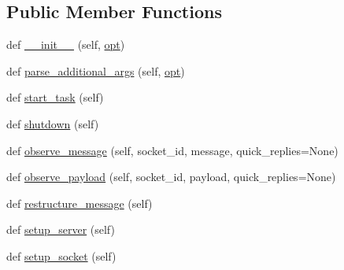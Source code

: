 \subsection*{Public Member Functions}
\begin{DoxyCompactItemize}
\item 
def \hyperlink{classparlai_1_1chat__service_1_1services_1_1websocket_1_1websocket__manager_1_1WebsocketManager_ae44392cd364b3041420877e4f281261e}{\+\_\+\+\_\+init\+\_\+\+\_\+} (self, \hyperlink{classparlai_1_1chat__service_1_1services_1_1websocket_1_1websocket__manager_1_1WebsocketManager_a48a72c535cb36615ba3f698446ab4aef}{opt})
\item 
def \hyperlink{classparlai_1_1chat__service_1_1services_1_1websocket_1_1websocket__manager_1_1WebsocketManager_ab5ae0fc35ee7b4c2015954814b8b60de}{parse\+\_\+additional\+\_\+args} (self, \hyperlink{classparlai_1_1chat__service_1_1services_1_1websocket_1_1websocket__manager_1_1WebsocketManager_a48a72c535cb36615ba3f698446ab4aef}{opt})
\item 
def \hyperlink{classparlai_1_1chat__service_1_1services_1_1websocket_1_1websocket__manager_1_1WebsocketManager_a79bfe4b1d87644284affbe3963c8decd}{start\+\_\+task} (self)
\item 
def \hyperlink{classparlai_1_1chat__service_1_1services_1_1websocket_1_1websocket__manager_1_1WebsocketManager_a50a3ee9e3306b49c38eb1c480aa03734}{shutdown} (self)
\item 
def \hyperlink{classparlai_1_1chat__service_1_1services_1_1websocket_1_1websocket__manager_1_1WebsocketManager_ab4710951b0d3ac7e00836c15760edf4a}{observe\+\_\+message} (self, socket\+\_\+id, message, quick\+\_\+replies=None)
\item 
def \hyperlink{classparlai_1_1chat__service_1_1services_1_1websocket_1_1websocket__manager_1_1WebsocketManager_a71ce917832632d10f3aafd6e8644d3f5}{observe\+\_\+payload} (self, socket\+\_\+id, payload, quick\+\_\+replies=None)
\item 
def \hyperlink{classparlai_1_1chat__service_1_1services_1_1websocket_1_1websocket__manager_1_1WebsocketManager_ab50f384331aea23175f690642717958a}{restructure\+\_\+message} (self)
\item 
def \hyperlink{classparlai_1_1chat__service_1_1services_1_1websocket_1_1websocket__manager_1_1WebsocketManager_abd3815e2b102c46a68be1f907749cd05}{setup\+\_\+server} (self)
\item 
def \hyperlink{classparlai_1_1chat__service_1_1services_1_1websocket_1_1websocket__manager_1_1WebsocketManager_adc9f886e43d7bf42941cf95914468817}{setup\+\_\+socket} (self)
\end{DoxyCompactItemize}
